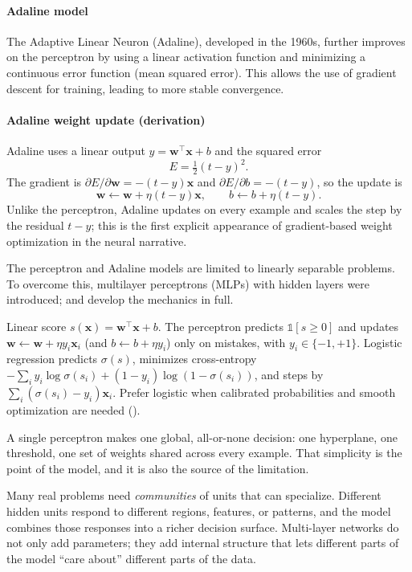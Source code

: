 \paragraph{Adaline model}

The Adaptive Linear Neuron (Adaline), developed in the 1960s, further improves on the perceptron by using a linear activation function and minimizing a continuous error function (mean squared error). This allows the use of gradient descent for training, leading to more stable convergence.

\paragraph{Adaline weight update (derivation)}
Adaline uses a linear output \(y = \mathbf{w}^\top \mathbf{x} + b\) and the squared error
\[
E = \tfrac{1}{2}(t-y)^2.
\]
The gradient is \(\partial E / \partial \mathbf{w} = -(t-y)\mathbf{x}\) and \(\partial E/\partial b = -(t-y)\), so the update is
\[
\mathbf{w} \leftarrow \mathbf{w} + \eta (t-y)\mathbf{x}, \qquad
b \leftarrow b + \eta (t-y).
\]
Unlike the perceptron, Adaline updates on every example and scales the step by the residual \(t-y\); this is the first explicit appearance of gradient-based weight optimization in the neural narrative.

The perceptron and Adaline models are limited to linearly separable problems. To overcome this, multilayer perceptrons (MLPs) with hidden layers were introduced;  and  develop the mechanics in full.

\begin{tcolorbox}[summarybox, title={Perceptron vs.\ logistic regression}]
Linear score \(s(\mathbf{x})=\mathbf{w}^\top\mathbf{x}+b\). The perceptron predicts \(\mathbb{1}[s\ge 0]\) and updates \(\mathbf{w}\leftarrow \mathbf{w}+\eta y_i\mathbf{x}_i\) (and \(b\leftarrow b+\eta y_i\)) only on mistakes, with \(y_i\in\{-1,+1\}\). Logistic regression predicts \(\sigma(s)\), minimizes cross\hyp{}entropy \(-\sum_i y_i\log\sigma(s_i)+(1-y_i)\log(1-\sigma(s_i))\), and steps by \(\sum_i(\sigma(s_i)-y_i)\mathbf{x}_i\). Prefer logistic when calibrated probabilities and smooth optimization are needed ().
\end{tcolorbox}

\begin{tcolorbox}[summarybox, title={Author's note: what a single perceptron cannot express}]
A single perceptron makes one global, all-or-none decision: one hyperplane, one threshold, one set of weights shared across every example. That simplicity is the point of the model, and it is also the source of the limitation.

Many real problems need \emph{communities} of units that can specialize. Different hidden units respond to different regions, features, or patterns, and the model combines those responses into a richer decision surface. Multi-layer networks do not only add parameters; they add internal structure that lets different parts of the model ``care about'' different parts of the data.
\end{tcolorbox}

